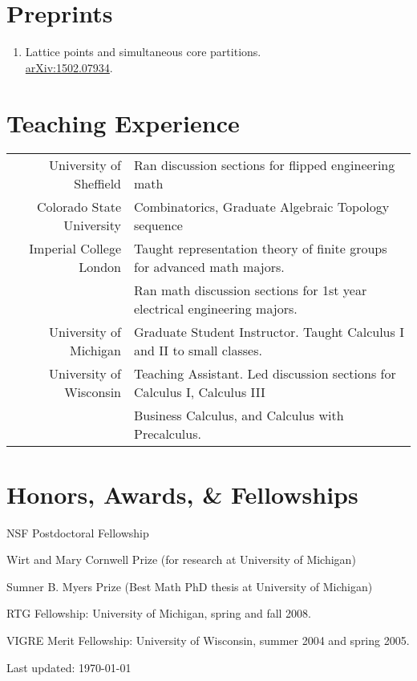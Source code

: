 \documentclass[11pt,letterpaper]{article}
\def\footerlink{}
\renewenvironment{itemize}{
  \begin{list}{}{
    \setlength{\leftmargin}{1.5em}
  }
}{
  \end{list}
}
\begin{document}
\section*{Preprints}
\begin{enumerate}

\item Lattice points and simultaneous core partitions. \\
\href{http://arxiv.org/abs/1502.07934}{arXiv:1502.07934}.
\end{enumerate}



\section*{Teaching Experience}
\begin{tabular}{rl}
University of Sheffield & Ran discussion sections for flipped engineering math \\
Colorado State University & Combinatorics, Graduate Algebraic Topology sequence \\
\rule{0pt}{3ex}Imperial College London & Taught representation theory of finite groups for advanced math majors.  \\
& Ran math discussion sections for 1st year electrical engineering majors. \\
\rule{0pt}{3ex}University of Michigan & Graduate Student Instructor. Taught Calculus I and II to small classes. \\
\rule{0pt}{3ex}University of Wisconsin &  Teaching Assistant. Led discussion sections for Calculus I, Calculus III \\
&  Business Calculus, and Calculus with Precalculus. \\
\end{tabular}


\section*{Honors, Awards, \& Fellowships}

\begin{itemize}
\item NSF Postdoctoral Fellowship
\item Wirt and Mary Cornwell Prize (for research at University of Michigan)
\item Sumner B. Myers Prize (Best Math PhD thesis at University of Michigan)
\item RTG Fellowship: University of Michigan, spring and fall 2008.
\item VIGRE Merit Fellowship: University of Wisconsin, summer 2004 and spring 2005.
\end{itemize}




\begin{center}
  \begin{footnotesize}
    Last updated: \today \\
    \href{\footerlink}{\texttt{\footerlink}}
  \end{footnotesize}
\end{center}
\end{document}
